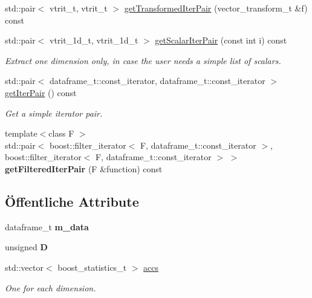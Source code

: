\begin{DoxyCompactItemize}
\item 
std::pair$<$ vtrit\_\-t, vtrit\_\-t $>$ \hyperlink{classCDA_1_1EnhancedDataset_a7882f2a098711508ca8a9c7a6e24dbed}{getTransformedIterPair} (vector\_\-transform\_\-t \&f) const 
\item 
std::pair$<$ vtrit\_\-1d\_\-t, vtrit\_\-1d\_\-t $>$ \hyperlink{classCDA_1_1EnhancedDataset_ae94abbc9c4249e7c8dd7219e94c2d387}{getScalarIterPair} (const int i) const 
\begin{DoxyCompactList}\small\item\em Extract one dimension only, in case the user needs a simple list of scalars. \item\end{DoxyCompactList}\item 
std::pair$<$ dataframe\_\-t::const\_\-iterator, dataframe\_\-t::const\_\-iterator $>$ \hyperlink{classCDA_1_1EnhancedDataset_a7545c4c91dff1ccea71b02b5acdba507}{getIterPair} () const 
\begin{DoxyCompactList}\small\item\em Get a simple iterator pair. \item\end{DoxyCompactList}\item 
\hypertarget{classCDA_1_1EnhancedDataset_a52334e7e5f1fb68e0414a42cbb4a6d6d}{
{\footnotesize template$<$class F $>$ }\\std::pair$<$ boost::filter\_\-iterator$<$ F, dataframe\_\-t::const\_\-iterator $>$, boost::filter\_\-iterator$<$ F, dataframe\_\-t::const\_\-iterator $>$ $>$ {\bfseries getFilteredIterPair} (F \&function) const }
\label{classCDA_1_1EnhancedDataset_a52334e7e5f1fb68e0414a42cbb4a6d6d}

\end{DoxyCompactItemize}
\subsection*{Öffentliche Attribute}
\begin{DoxyCompactItemize}
\item 
\hypertarget{classCDA_1_1EnhancedDataset_a10e8496988b39465453b93894c1532d1}{
dataframe\_\-t {\bfseries m\_\-data}}
\label{classCDA_1_1EnhancedDataset_a10e8496988b39465453b93894c1532d1}

\item 
\hypertarget{classCDA_1_1EnhancedDataset_ae2e4868942ed33abf9d495b59525933b}{
unsigned {\bfseries D}}
\label{classCDA_1_1EnhancedDataset_ae2e4868942ed33abf9d495b59525933b}

\item 
\hypertarget{classCDA_1_1EnhancedDataset_a0a2a1d4c3eda234c49cc8192b5924045}{
std::vector$<$ boost\_\-statistics\_\-t $>$ \hyperlink{classCDA_1_1EnhancedDataset_a0a2a1d4c3eda234c49cc8192b5924045}{accs}}
\label{classCDA_1_1EnhancedDataset_a0a2a1d4c3eda234c49cc8192b5924045}

\begin{DoxyCompactList}\small\item\em One for each dimension. \item\end{DoxyCompactList}\end{DoxyCompactItemize}


